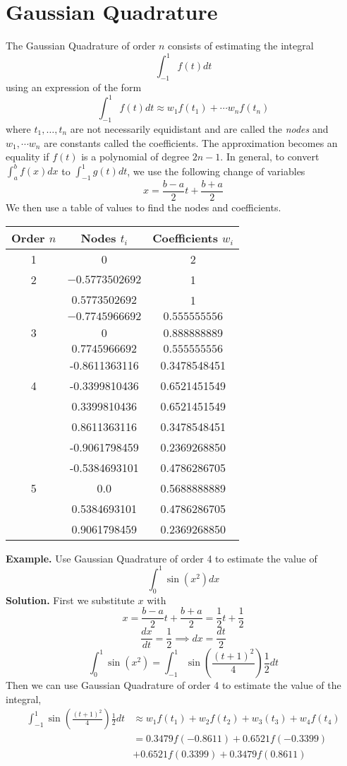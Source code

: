 \documentclass[openany]{report}
\begin{document}
\section{Gaussian Quadrature}
The Gaussian Quadrature of order $n$ consists of estimating the integral 
\[\int_{-1}^{1}f(t)dt\]
using an expression of the form 
\[\int_{-1}^{1}f(t)dt \approx w_1f(t_1) + \cdots w_nf(t_n)\]
where $t_1, \ldots, t_n$  are not necessarily equidistant and are called the \emph{nodes} and $w_1,\cdots w_n$ are constants called the coefficients. The approximation becomes an equality if $f(t)$ is a polynomial of degree $2n-1$. In general, to convert $\int_a^bf(x)dx$ to $\int_{-1}^{1}g(t)dt$, we use the following change of variables
\[x = \frac{b-a}{2}t + \frac{b+a}{2}\]
We then use a table of values to find the nodes and coefficients.
\begin{center}
    \begin{tabular}{c|cc}
        Order $n$ & Nodes $t_i$ & Coefficients $w_i$\\
        \hline
        1 & 0 & 2\\
        \hline
        2 & $-0.5773502692$ & 1\\
        & $0.5773502692$ & 1\\
        \hline
        & $-0.7745966692$ & $0.555555556$\\
        3 & 0 & 0.888888889\\
        & $0.7745966692$ & $0.555555556$\\
        \hline
        & -0.8611363116 &0.3478548451\\
        4&-0.3399810436& 0.6521451549\\
        &0.3399810436 &0.6521451549\\
        &0.8611363116 &0.3478548451\\
        \hline
        &-0.9061798459 &0.2369268850\\
        &-0.5384693101& 0.4786286705\\
        5 &0.0 &0.5688888889\\
        &0.5384693101 &0.4786286705\\
        &0.9061798459& 0.2369268850\\
    \end{tabular}
\end{center}
\noindent
\textbf{Example.} Use Gaussian Quadrature of order 4 to estimate the value of 
\[\int_{0}^1\sin(x^2)dx\]
\textbf{Solution.} First we substitute $x$ with 
\[x = \frac{b-a}{2}t + \frac{b+a}{2} = \frac{1}{2}t +\frac{1}{2}\]
\[\frac{dx}{dt} = \frac{1}{2} \implies dx = \frac{dt}{2}\]
\[\int_0^1 \sin(x^2) = \int_{-1}^1 \sin \left(\frac{(t+1)^2}{4}\right) \frac{1}{2}dt\]
Then we can use Gaussian Quadrature of order 4 to estimate the value of the integral,
\begin{align*}
    \int_{-1}^1 \sin \left(\frac{(t+1)^2}{4}\right) \frac{1}{2}dt &\approx w_1f(t_1) + w_2f(t_2) + w_3(t_3) + w_4f(t_4)\\
    &= 0.3479f(-0.8611) + 0.6521f(-0.3399)\\
    &+0.6521f(0.3399) + 0.3479f(0.8611)\\
\end{align*}
\end{document}
